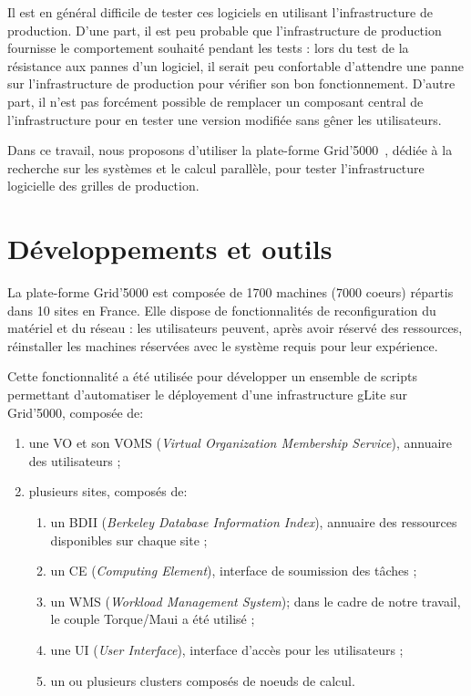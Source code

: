 \documentclass[a4paper,11pt]{article}
\begin{document}
Il est en général difficile de tester ces logiciels en utilisant
l'infrastructure de production. D'une part, il est peu probable que
l'infrastructure de production fournisse le comportement souhaité pendant les
tests : lors du test de la résistance aux pannes d'un logiciel, il serait peu
confortable d'attendre une panne sur l'infrastructure de production pour
vérifier son bon fonctionnement. D'autre part, il n'est pas forcément possible
de remplacer un composant central de l'infrastructure pour en tester une
version modifiée sans gêner les utilisateurs.

Dans ce travail, nous proposons d'utiliser la plate-forme
Grid'5000~\cite{grid5000,grid5000web}, dédiée à la recherche sur les systèmes
et le calcul parallèle, pour tester l'infrastructure logicielle des grilles de
production.

\section{Développements et outils}

La plate-forme Grid'5000 est composée de 1700 machines (7000 coeurs) répartis
dans 10 sites en France. Elle dispose de fonctionnalités de reconfiguration du
matériel et du réseau : les utilisateurs peuvent, après avoir réservé des
ressources, réinstaller les machines réservées avec le système requis pour leur
expérience.

Cette fonctionnalité a été utilisée pour développer un ensemble de scripts
permettant d'automatiser le déployement d'une infrastructure gLite sur
Grid'5000, composée de:

\begin{enumerate}

\item une VO et son VOMS (\textsl{Virtual Organization Membership Service}),
	annuaire des utilisateurs ;

\item plusieurs sites, composés de:

\begin{enumerate}

	\item un BDII (\textsl{Berkeley Database Information Index}), annuaire
		des ressources disponibles sur chaque site ;

	\item un CE (\textsl{Computing Element}), interface de soumission des
		tâches ;

	\item un WMS (\textsl{Workload Management System}); dans le cadre de
		notre travail, le couple Torque/Maui a été utilisé ;

	\item une UI (\textsl{User Interface}), interface d'accès pour les
		utilisateurs ;

	\item un ou plusieurs clusters composés de noeuds de calcul.

\end{enumerate}
\end{enumerate}
\end{document}
